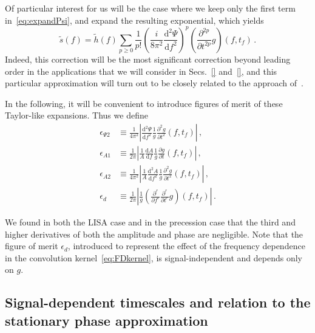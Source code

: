 \documentclass[aps,showpacs,%
prd,superscriptaddress,nofootinbib]{revtex4}
\newcommand{\be}{\begin{equation}}
\newcommand{\ee}{\end{equation}}
\newcommand\ud{{\mathrm{d}}}
\newcommand{\tf}{t_{f}}
\begin{document}
Of particular interest for us will be the case where we keep only the first term in~\eqref{eq:expandPsi}, and expand the resulting exponential, which yields
\be\label{eq:resultdffPsi}
	\tilde{s}(f) = \tilde{h}(f) \sum\limits_{p\geq 0} \frac{1}{p!} \left( \frac{i}{8\pi^{2}}\frac{\ud^{2} \Psi}{\ud f^{2}} \right)^{p} \left( \frac{\partial^{2p} }{\partial t^{2p}} g \right)(f, \tf) \,.
\ee
Indeed, this correction will be the most significant correction beyond leading order in the applications that we will consider in Secs.~\ref{} and~\ref{}, and this particular approximation will turn out to be closely related to the approach of~\cite{Klein+14}.

In the following, it will be convenient to introduce figures of merit of these Taylor-like expansions. Thus we define
\begin{subequations}\label{eq:deffom}
\begin{align}
	\epsilon_{\Psi 2} &\equiv \frac{1}{4\pi^{2}} \left| \frac{\ud^{2} \Psi}{\ud f^{2}} \frac{1}{g} \frac{\partial^{2} g}{\partial t^{2}}(f, \tf) \right| \,, \\
	\epsilon_{A 1} &\equiv \frac{1}{2\pi} \left| \frac{1}{A}\frac{\ud A}{\ud f} \frac{1}{g} \frac{\partial g}{\partial t}(f, \tf) \right| \,, \\
	\epsilon_{A 2} &\equiv \frac{1}{4\pi^{2}} \left| \frac{1}{A}\frac{\ud^{2} A}{\ud f^{2}} \frac{1}{g} \frac{\partial^{2} g}{\partial t^{2}}(f, \tf) \right| \,, \\
	\epsilon_{d} &\equiv \frac{1}{2\pi} \left| \frac{1}{g} \left( \frac{\partial^{r} }{\partial f^{r}} \frac{\partial^{r} }{\partial t^{r}} g \right)(f, \tf) \right| \,.
\end{align}
\end{subequations}

We found in both the LISA case and in the precession case that the third and higher derivatives of both the amplitude and phase are negligible. Note that the figure of merit $\epsilon_{d}$, introduced to represent the effect of the frequency dependence in the convolution kernel~\eqref{eq:FDkernel}, is signal-independent and depends only on $g$.


\subsection{Signal-dependent timescales and relation to the stationary phase approximation}
\label{subsec:linkSPA}
\end{document}
